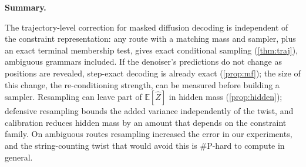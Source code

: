 \documentclass[11pt]{article}
\theoremstyle{definition}
\newcommand{\E}{\mathbb{E}}
\newcommand{\Zh}{\widehat Z}
\newenvironment{claimbox}[1]
  {\begin{mdframed}[linewidth=0.6pt,roundcorner=2pt,backgroundcolor=black!3,
    innertopmargin=6pt,innerbottommargin=6pt]\textbf{#1}\par\smallskip}
  {\end{mdframed}}
\begin{document}
\begin{claimbox}{Summary.}
The trajectory-level correction for masked diffusion decoding is independent of the constraint representation:
any route with a matching mass and sampler, plus an exact terminal membership test, gives exact conditional
sampling (\cref{thm:traj}), ambiguous grammars included. If the denoiser's predictions do not change as positions
are revealed, step-exact decoding is already exact (\cref{prop:mf}); the size of this change, the re-conditioning
strength, can be measured before building a sampler. Resampling can leave part of $\E[\Zh]$ in hidden mass
(\cref{prop:hidden}); defensive resampling bounds the added variance independently of the twist, and calibration
reduces hidden mass by an amount that depends on the constraint family. On ambiguous routes resampling increased
the error in our experiments, and the string-counting twist that would avoid this is \#P-hard to compute in
general.
\end{claimbox}
\end{document}
